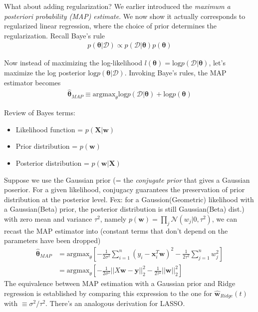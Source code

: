 \documentclass[norsk,a4paper,11pt]{article}
\begin{document}
What about adding regularization? We earlier introduced the \textit{maximum a posteriori probability (MAP) estimate}. We now show it actually corresponds to regularized linear regression, where the choice of prior determines the regularization. Recall Baye's rule
\begin{align}
	p(\bm{\theta}| \mathcal{D}) \propto p(\mathcal{D} | \bm{\theta}) p(\bm{\theta})
\end{align} 

Now instead of maximizing the log-likelihood $l(\bm{\theta}) = \text{log} p(\mathcal{D} | \bm{\theta})$, let's maximize the log posterior $\text{log} p(\bm{\theta} | \mathcal{D})$. Invoking Baye's rules, the MAP estimator becomes
\begin{align}
	\hat{\bm{\theta}}_{MAP} \equiv \text{argmax}_\theta \text{log} p(\mathcal{D} | \bm{\theta}) + \text{log} p(\bm{\theta})
\end{align}

{\tiny
Review of Bayes terms:
\begin{itemize}
	\item Likelihood function = $p(\bm{X}|\bm{w})$
	\item Prior distribution = $p(\bm{w})$
	\item Posterior distribution = $p(\bm{w}|\bm{X})$
\end{itemize}
}

Suppose we use the Gaussian prior (= the \textit{conjugate prior} that gives a Gaussian poserior. For a given likelihood, conjugacy guarantees the preservation of prior distribution at the posterior level. Fex: for a Gaussion(Geometric) likelihood with a Gaussian(Beta) prior, the posterior distribution is still Gaussian(Beta) dist.) with zero mean and variance $\tau^2$, namely $p(\bm{w}) = \prod_j \mathcal{N}(w_j | 0, \tau^2)$, we can recast the MAP estimator into (constant terms that don't depend on the parameters have been dropped)
\begin{align}
	\hat{\bm{\theta}}_{MAP} &= \text{argmax}_\theta [- \frac{1}{2\sigma^2} \sum_{i=1}^n (y_i - \bm{x}_i^T \bm{w})^2 -\frac{1}{2\tau^2} \sum_{j=1}^n w_j^2  ] \\ 
	&= \text{argmax}_\theta [- \frac{1}{2\sigma^2} ||X \bm{w} - \bm{y}||_2^2 -\frac{1}{2\tau^2} ||\bm{w}||_2^2  ]
\end{align}
The equivalence between MAP estimation with a Gaussian prior and Ridge regression is established by comparing this expression to the one for $\hat{\bm{w}}_{Ridge} (t)$ with $\equiv \sigma^2 / \tau^2 $. There's an analogous derivation for LASSO.
\end{document}
